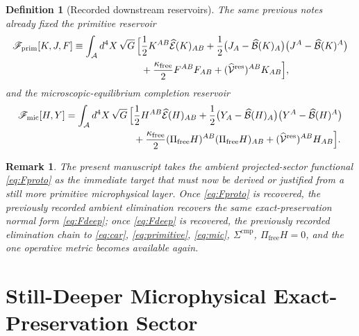 \documentclass[11pt]{article}
\newcommand{\Sub}{\mathcal A}
\newcommand{\ResidualLift}{\widehat{\mathcal V}^{\mathrm{res}}}
\newcommand{\SubEinLin}{\widehat{\mathcal E}}
\newcommand{\SubGaugeVec}{\widehat{\mathcal B}}
\newcommand{\FreeProj}{\Pi_{\mathrm{free}}}
\newcommand{\GaugeAux}{Y}
\newcommand{\MicFunctional}{\mathscr F_{\mathrm{mic}}}
\newcommand{\PrimFunctional}{\mathscr F_{\mathrm{prim}}}
\newcommand{\FreeStiff}{\kappa_{\mathrm{free}}}
\newcommand{\PrimStrain}{K}
\newcommand{\PrimNeutral}{J}
\newcommand{\PrimFree}{F}
\newtheorem{definition}{Definition}
\newtheorem{remark}{Remark}
\begin{document}
\begin{definition}[Recorded downstream reservoirs]
\label{def:downstream}
The same previous notes already fixed the primitive reservoir
\begin{equation}
\begin{aligned}
\PrimFunctional[\PrimStrain,\PrimNeutral,\PrimFree]
\equiv
\int_{\Sub} d^4X\,\sqrt{G}\,
\Bigl[
&\frac12 \PrimStrain^{AB}\SubEinLin(\PrimStrain)_{AB}
+\frac12\bigl(\PrimNeutral_A-\SubGaugeVec(\PrimStrain)_A\bigr)
\bigl(\PrimNeutral^A-\SubGaugeVec(\PrimStrain)^A\bigr)
\\
&+\frac{\FreeStiff}{2}\PrimFree^{AB}\PrimFree_{AB}
+(\ResidualLift)^{AB}\PrimStrain_{AB}
\Bigr],
\end{aligned}
\label{eq:primitive}
\end{equation}
and the microscopic-equilibrium completion reservoir
\begin{equation}
\begin{aligned}
\MicFunctional[H,\GaugeAux]
=
\int_{\Sub} d^4X\,\sqrt{G}\,
\Bigl[
&\frac12 H^{AB}\SubEinLin(H)_{AB}
+\frac12\bigl(\GaugeAux_A-\SubGaugeVec(H)_A\bigr)
\bigl(\GaugeAux^A-\SubGaugeVec(H)^A\bigr)
\\
&+\frac{\FreeStiff}{2}(\FreeProj H)^{AB}(\FreeProj H)_{AB}
+(\ResidualLift)^{AB}H_{AB}
\Bigr].
\end{aligned}
\label{eq:mic}
\end{equation}
\end{definition}

\begin{remark}
The present manuscript takes the ambient projected-sector functional \eqref{eq:Fproto} as the immediate target that must now be derived or justified from a still more primitive microphysical layer. Once \eqref{eq:Fproto} is recovered, the previously recorded ambient elimination recovers the same exact-preservation normal form \eqref{eq:Fdeep}; once \eqref{eq:Fdeep} is recovered, the previously recorded elimination chain to \eqref{eq:car}, \eqref{eq:primitive}, \eqref{eq:mic}, \(\Sigma^{\mathrm{cmp}}\), \(\Pi_{\mathrm{free}}H=0\), and the one operative metric becomes available again.
\end{remark}

\section{Still-Deeper Microphysical Exact-Preservation Sector}
\end{document}
